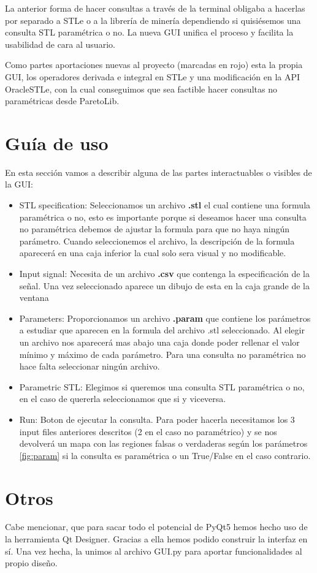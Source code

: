 La anterior forma de hacer consultas a través de la terminal obligaba a hacerlas por separado a STLe o a la librería de minería dependiendo si quisiésemos una consulta STL paramétrica o no. La nueva GUI unifica el proceso y facilita la usabilidad de cara al usuario.

Como partes aportaciones nuevas al proyecto (marcadas en rojo) esta la propia GUI, los operadores derivada e integral en STLe y una modificación en la API OracleSTLe, con la cual conseguimos que sea factible hacer consultas no paramétricas desde ParetoLib.

\section{Guía de uso}
En esta sección vamos a describir alguna de las partes interactuables o visibles de la GUI:

\begin{itemize}
\item STL specification: Seleccionamos un archivo \textbf{.stl} el cual contiene una formula paramétrica o no, esto es importante porque si deseamos hacer una consulta no paramétrica debemos de ajustar la formula para que no haya ningún parámetro. Cuando seleccionemos el archivo, la descripción de la formula aparecerá en una caja inferior la cual solo sera visual y no modificable.

\item Input signal: Necesita de un archivo \textbf{.csv} que contenga la especificación de la señal. Una vez seleccionado aparece un dibujo de esta en la caja grande de la ventana

\item Parameters: Proporcionamos un archivo \textbf{.param} que contiene los parámetros a estudiar que aparecen en la formula del archivo .stl seleccionado. Al elegir un archivo nos aparecerá mas abajo una caja donde poder rellenar el valor mínimo y máximo de cada parámetro. Para una consulta no paramétrica no hace falta seleccionar ningún archivo.

\item Parametric STL: Elegimos si queremos una consulta STL paramétrica o no, en el caso de quererla seleccionamos que si y viceversa.

\item Run: Boton de ejecutar la consulta. Para poder hacerla necesitamos los 3 input files anteriores descritos (2 en el caso no paramétrico) y se nos devolverá un mapa con las regiones falsas o verdaderas según los parámetros \ref{fig:param} si la consulta es paramétrica o un True/False en el caso contrario. 
\end{itemize} 

\section{Otros}
Cabe mencionar, que para sacar todo el potencial de PyQt5 hemos hecho uso de la herramienta Qt Designer. Gracias a ella hemos podido construir la interfaz en sí. Una vez hecha, la unimos al archivo GUI.py para aportar funcionalidades al propio diseño.
